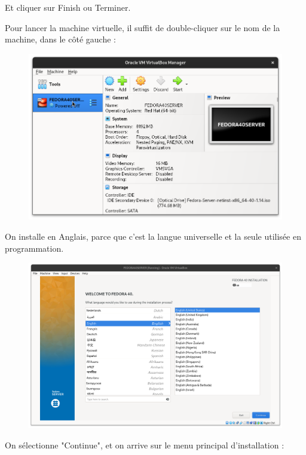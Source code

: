 \documentclass{article}
\begin{document}
Et cliquer sur Finish ou Terminer.

\pagebreak

Pour lancer la machine virtuelle, il suffit de double-cliquer sur le nom de la machine, dans le côté gauche : 

\begin{figure}[h!]
		\centering
		\includegraphics[width=1\textwidth]{vbox5.png}
\end{figure}

On installe en Anglais, parce que c'est la langue universelle et la seule utilisée en programmation.

\begin{figure}[h!]
		\centering
		\includegraphics[width=1\textwidth]{vbox6.png}
\end{figure}

\pagebreak
On sélectionne "Continue", et on arrive sur le menu principal d'installation :
\end{document}
